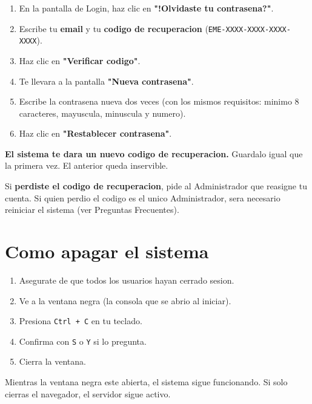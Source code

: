 \documentclass[11pt,a4paper]{article}
\begin{document}
\begin{enumerate}
    \item En la pantalla de Login, haz clic en \textbf{"!Olvidaste tu contrasena?"}.
    \item Escribe tu \textbf{email} y tu \textbf{codigo de recuperacion} (\texttt{EME-XXXX-XXXX-XXXX-XXXX}).
    \item Haz clic en \textbf{"Verificar codigo"}.
    \item Te llevara a la pantalla \textbf{"Nueva contrasena"}.
    \item Escribe la contrasena nueva dos veces (con los mismos requisitos: minimo 8 caracteres, mayuscula, minuscula y numero).
    \item Haz clic en \textbf{"Restablecer contrasena"}.
\end{enumerate}

\begin{cajaCritica}
    \textbf{El sistema te dara un nuevo codigo de recuperacion.} Guardalo igual que la primera vez. El anterior queda inservible.
\end{cajaCritica}

\begin{cajaInfo}
    Si \textbf{perdiste el codigo de recuperacion}, pide al Administrador que reasigne tu cuenta. Si quien perdio el codigo es el unico Administrador, sera necesario reiniciar el sistema (ver Preguntas Frecuentes).
\end{cajaInfo}

\section{Como apagar el sistema}

\begin{enumerate}
    \item Asegurate de que todos los usuarios hayan cerrado sesion.
    \item Ve a la ventana negra (la consola que se abrio al iniciar).
    \item Presiona \texttt{Ctrl + C} en tu teclado.
    \item Confirma con \texttt{S} o \texttt{Y} si lo pregunta.
    \item Cierra la ventana.
\end{enumerate}

\begin{cajaTip}
    Mientras la ventana negra este abierta, el sistema sigue funcionando. Si solo cierras el navegador, el servidor sigue activo.
\end{cajaTip}
\end{document}
